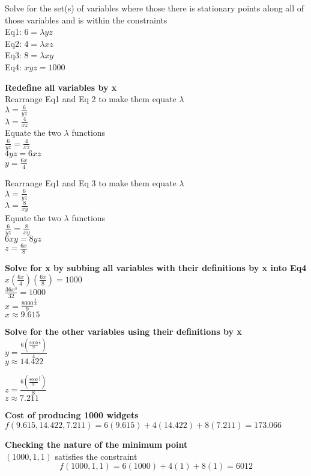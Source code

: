 \documentclass[11pt]{article}
\begin{document}
Solve for the set(s) of variables where those there is stationary points
along all of those variables and is within the constraints\\
Eq1: \(6 = \lambda yz\)\\
Eq2: \(4 = \lambda xz\)\\
Eq3: \(8 = \lambda xy\)\\
Eq4: \(xyz = 1000\)

    \textbf{Redefine all variables by x}\\
Rearrange Eq1 and Eq 2 to make them equate \(\lambda\)\\
\(\lambda = \frac{6}{yz}\)\\
\(\lambda = \frac{4}{xz}\)\\
Equate the two \(\lambda\) functions\\
\(\frac{6}{yz} = \frac{4}{xz}\)\\
\(4yz = 6xz\)\\
\(y = \frac{6x}{4}\)

Rearrange Eq1 and Eq 3 to make them equate \(\lambda\)\\
\(\lambda = \frac{6}{yz}\)\\
\(\lambda = \frac{8}{xy}\)\\
Equate the two \(\lambda\) functions\\
\(\frac{6}{yz} = \frac{8}{xy}\)\\
\(6xy = 8yz\)\\
\(z = \frac{6x}{8}\)

\textbf{Solve for x by subbing all variables with their definitions by x
into Eq4}\\
\(x(\frac{6x}{4})(\frac{6x}{8}) = 1000\)\\
\(\frac{36x^3}{32} = 1000\)\\
\(x = \frac{8000}{9}^\frac{1}{3}\)\\
\(x \approx 9.615\)

\textbf{Solve for the other variables using their definitions by x}\\
\(y = \frac{6(\frac{8000}{9}^\frac{1}{3})}{4}\)\\
\(y \approx 14.422\)

\(z = \frac{6(\frac{8000}{9}^\frac{1}{3})}{8}\)\\
\(z \approx 7.211\)

\textbf{Cost of producing 1000 widgets}\\
\(f(9.615,14.422,7.211) = 6(9.615)+4(14.422)+8(7.211) = 173.066\)

\textbf{Checking the nature of the minimum point}\\
\((1000,1,1)\) satisfies the constraint\\
\[f(1000,1,1) = 6(1000)+4(1)+8(1) = 6012\]
\end{document}
